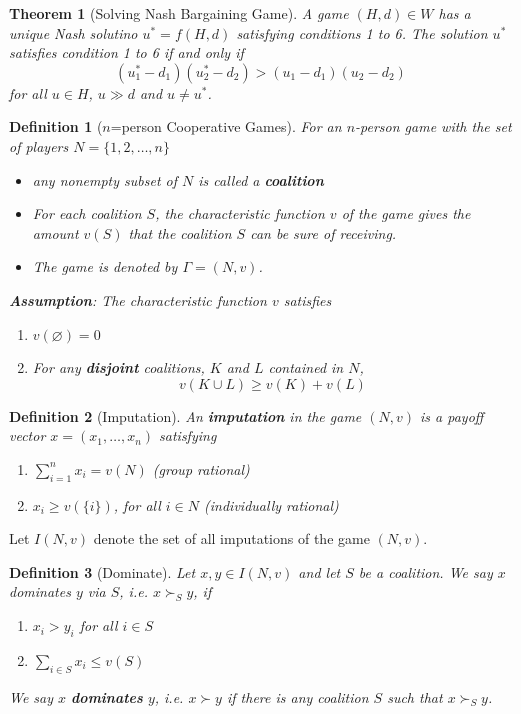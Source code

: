 \documentclass[12pt]{article}
\newtheorem{definition}{Definition}[section]
\newtheorem{theorem}{Theorem}[section]
\theoremstyle{definition}
\begin{document}
\begin{theorem}[Solving Nash Bargaining Game]
\normalfont A game $(H, d)\in W$ has a unique Nash solutino $u^\ast=f(H, d)$ satisfying conditions 1 to 6. The solution $u^\ast$ satisfies condition 1 to 6 if and only if
\[
(u_1^\ast - d_1)(u_2^\ast -d_2)>(u_1-d_1)(u_2-d_2)
\]
for all $u\in H$, $u\gg d$ and $u\neq u^\ast$.
\end{theorem}
\begin{definition}[{$n$}=person Cooperative Games]
\normalfont For an $n$-person game with the set of players $N=\{1,2,\ldots, n\}$
\begin{itemize}
  \item any nonempty subset of $N$ is called a \textbf{coalition}
  \item For each coalition $S$, the characteristic function $v$ of the game gives the amount $v(S)$ that the coalition $S$ can be sure of receiving.
  \item The game is denoted by $\Gamma = (N, v)$.
\end{itemize}
\textbf{Assumption}: The characteristic function $v$ satisfies
\begin{enumerate}
  \item $v(\varnothing)=0$
  \item For any \textbf{disjoint} coalitions, $K$ and $L$ contained in $N$, 
  \[
v(K\cup L)\geq v(K)+v(L)
  \]
\end{enumerate}
\end{definition}
\begin{definition}[Imputation]
\normalfont An \textbf{imputation} in the game $(N, v)$ is a payoff vector $x=(x_1,\ldots, x_n)$ satisfying
\begin{enumerate}
  \item $\sum_{i=1}^n x_i=v(N)$ (group rational)
  \item $x_i\geq v(\{i\})$, for all $i\in N$ (individually rational)
\end{enumerate}
\end{definition}
Let $I(N, v)$ denote the set of all imputations of the game $(N, v)$.
\begin{definition}[Dominate]
\normalfont Let $x, y\in I(N, v)$ and let $S$ be a coalition. We say $x$ dominates $y$ via $S$, i.e. $x\succ_S y$, if
\begin{enumerate}
  \item $x_i>y_i$ for all $i\in S$
  \item $\sum_{i\in S} x_i \leq v(S)$
\end{enumerate}
We say $x$ \textbf{dominates} $y$, i.e. $x\succ y$ if there is \textit{any} coalition $S$ such that $x\succ_S y$.
\end{definition}
\end{document}
